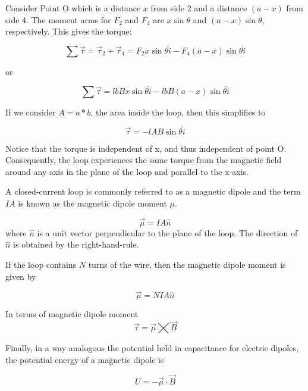 \documentclass[14pt]{memoir}
\begin{document}
Consider Point O which is a distance $x$ from side 2 and a distance $(a-x)$ from side 4. The moment arms for $F_2$ and $F_4$ are $x\sin{\theta}$ and $(a-x)\sin{\theta}$, respectively. This gives the torque:

\begin{equation}
\sum \vec{\tau} = \vec{\tau}_2 + \vec{\tau}_4 = F_2 x \sin{\theta} \hat{i} - F_4 (a-x) \sin{\theta} \hat{i}
\end{equation}

or 

\begin{equation}
\sum \vec{\tau} = l b B x \sin{\theta} \hat{i} - l b B (a-x) \sin{\theta} \hat{i}
\end{equation}

If we consider $A = a * b$, the area inside the loop, then this simplifies to 

\begin{equation}
\vec{\tau} = - l AB \sin{\theta} \hat{i}
\end{equation}

Notice that the torque is independent of x, and thus independent of point O. Consequently, the loop experiences the same torque from the magnetic field around any axis in the plane of the loop and parallel to the x-axis. 

A closed-current loop is commonly referred to as a magnetic dipole and the term $IA$ is known as the magnetic dipole moment $\mu$.

\begin{equation}
\vec{\mu} = IA \hat{n}
\end{equation}
where $\hat{n}$ is a unit vector perpendicular to the plane of the loop. The direction of $\hat{n}$ is obtained by the right-hand-rule. 

If the loop contains $N$ turns of the wire, then the magnetic dipole moment is given by

\begin{equation}
\vec{\mu} = NIA \hat{n}
\end{equation}

In terms of magnetic dipole moment
\begin{equation}
\vec{\tau} = \vec{\mu} \bigtimes \vec{B}
\end{equation}


Finally, in a way analogous the potential held in capacitance for electric dipoles, the potential energy of a magnetic dipole is 

\begin{equation}
U = - \vec{\mu} \cdot \vec{B}
\end{equation}
\end{document}
